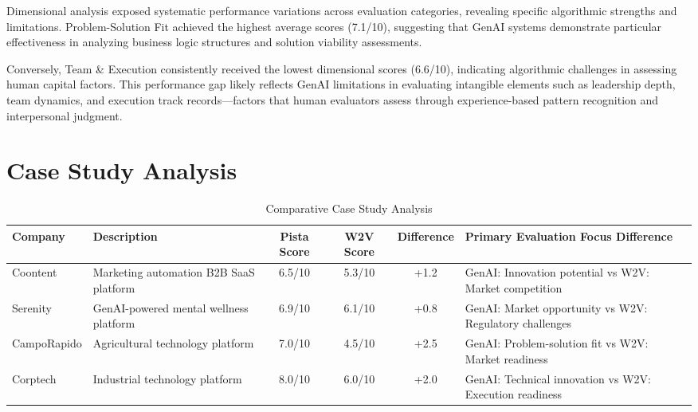 Dimensional analysis exposed systematic performance variations across evaluation categories, revealing specific algorithmic strengths and limitations. Problem-Solution Fit achieved the highest average scores (7.1/10), suggesting that GenAI systems demonstrate particular effectiveness in analyzing business logic structures and solution viability assessments.

Conversely, Team \& Execution consistently received the lowest dimensional scores (6.6/10), indicating algorithmic challenges in assessing human capital factors. This performance gap likely reflects GenAI limitations in evaluating intangible elements such as leadership depth, team dynamics, and execution track records—factors that human evaluators assess through experience-based pattern recognition and interpersonal judgment.

\section{Case Study Analysis}

\begin{table}[ht]
    \centering
    \caption{Comparative Case Study Analysis}
    \label{tab:case-studies}
    \begin{tabular}{lp{3cm}cccp{4cm}}
        \toprule
        \textbf{Company} & \textbf{Description} & \textbf{Pista Score} & \textbf{W2V Score} & \textbf{Difference} & \textbf{Primary Evaluation Focus Difference} \\
        \midrule
        Coontent & Marketing automation B2B SaaS platform & 6.5/10 & 5.3/10 & +1.2 & GenAI: Innovation potential vs W2V: Market competition \\
        \midrule
        Serenity & GenAI-powered mental wellness platform & 6.9/10 & 6.1/10 & +0.8 & GenAI: Market opportunity vs W2V: Regulatory challenges \\
        \midrule
        CampoRapido & Agricultural technology platform & 7.0/10 & 4.5/10 & +2.5 & GenAI: Problem-solution fit vs W2V: Market readiness \\
        \midrule
        Corptech & Industrial technology platform & 8.0/10 & 6.0/10 & +2.0 & GenAI: Technical innovation vs W2V: Execution readiness \\
        \bottomrule
    \end{tabular}
\end{table}

